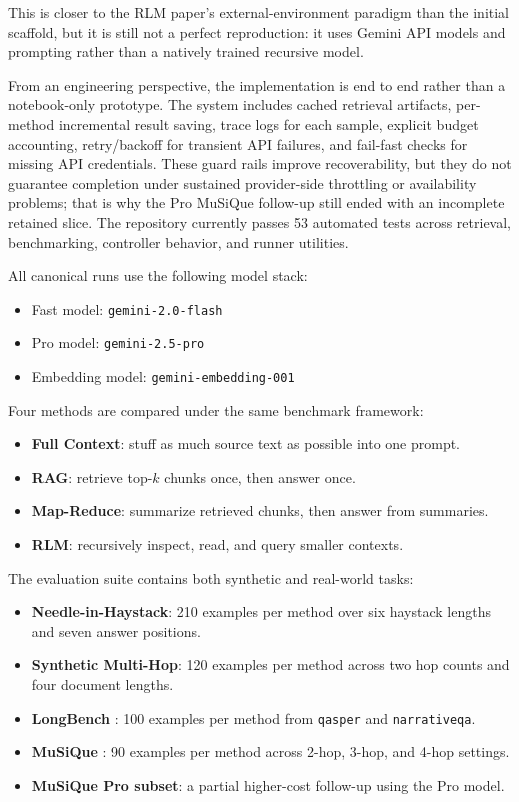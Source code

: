 \documentclass[11pt]{article}
\begin{document}
This is closer to the RLM paper's external-environment paradigm than the initial scaffold, but it is still not a perfect reproduction: it uses Gemini API models and prompting rather than a natively trained recursive model.

From an engineering perspective, the implementation is end to end rather than a notebook-only prototype. The system includes cached retrieval artifacts, per-method incremental result saving, trace logs for each sample, explicit budget accounting, retry/backoff for transient API failures, and fail-fast checks for missing API credentials. These guard rails improve recoverability, but they do not guarantee completion under sustained provider-side throttling or availability problems; that is why the Pro MuSiQue follow-up still ended with an incomplete retained slice. The repository currently passes 53 automated tests across retrieval, benchmarking, controller behavior, and runner utilities.

All canonical runs use the following model stack:
\begin{itemize}
  \item Fast model: \texttt{gemini-2.0-flash}
  \item Pro model: \texttt{gemini-2.5-pro}
  \item Embedding model: \texttt{gemini-embedding-001}
\end{itemize}

Four methods are compared under the same benchmark framework:
\begin{itemize}
  \item \textbf{Full Context}: stuff as much source text as possible into one prompt.
  \item \textbf{RAG}: retrieve top-$k$ chunks once, then answer once.
  \item \textbf{Map-Reduce}: summarize retrieved chunks, then answer from summaries.
  \item \textbf{RLM}: recursively inspect, read, and query smaller contexts.
\end{itemize}

The evaluation suite contains both synthetic and real-world tasks:
\begin{itemize}
  \item \textbf{Needle-in-Haystack}: 210 examples per method over six haystack lengths and seven answer positions.
  \item \textbf{Synthetic Multi-Hop}: 120 examples per method across two hop counts and four document lengths.
  \item \textbf{LongBench} \cite{bai2023longbench}: 100 examples per method from \texttt{qasper} and \texttt{narrativeqa}.
  \item \textbf{MuSiQue} \cite{trivedi2022musique}: 90 examples per method across 2-hop, 3-hop, and 4-hop settings.
  \item \textbf{MuSiQue Pro subset}: a partial higher-cost follow-up using the Pro model.
\end{itemize}
\end{document}
